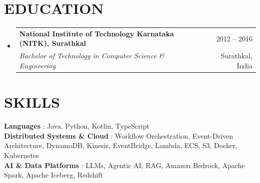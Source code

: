 \documentclass[letterpaper,11pt]{article}
\makeatletter
\newcommand{\resumeSubheading}[4]{
  \vspace{-1pt}\item
    \begin{tabular*}{\textwidth}[t]{l@{\extracolsep{\fill}}r}
      \textbf{#1} & {\color{dark-grey}\small #2}\vspace{1pt}\\ %
      \textit{#3} & {\color{dark-grey} \small #4}\\ %
    \end{tabular*}\vspace{-4pt}
}
\newcommand{\resumeSubHeadingListStart}{\begin{itemize}[leftmargin=0in, label={}]}
\newcommand{\resumeSubHeadingListEnd}{\end{itemize}}
\makeatother
\begin{document}
\section {EDUCATION}
  \resumeSubHeadingListStart
    \resumeSubheading
      {National Institute of Technology Karnataka (NITK), Surathkal}{2012 -- 2016}
      {Bachelor of Technology in Computer Science \& Engineering}{Surathkal, India}
  \resumeSubHeadingListEnd

\section{SKILLS}
 \begin{itemize}[leftmargin=0in, label={}]
    \small{\item{
     \textbf{Languages} {: Java, Python, Kotlin, TypeScript}\vspace{2pt} \\
     \textbf{Distributed Systems \& Cloud} {: Workflow Orchestration, Event-Driven Architecture, DynamoDB, Kinesis, EventBridge, Lambda, ECS, S3, Docker, Kubernetes}\vspace{2pt} \\
     \textbf{AI \& Data Platforms} {: LLMs, Agentic AI, RAG, Amazon Bedrock, Apache Spark, Apache Iceberg, Redshift}
    }}
 \end{itemize}


\end{document}
